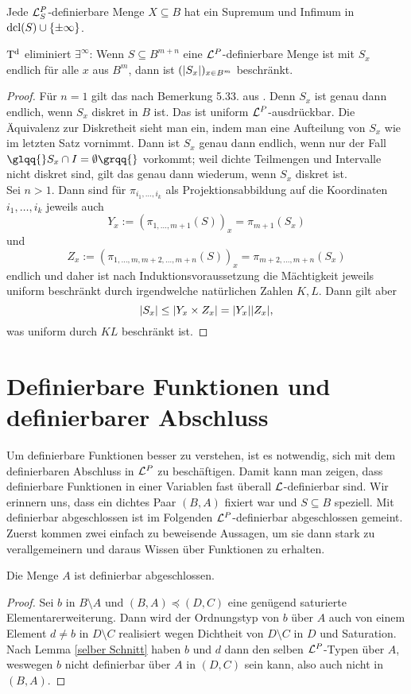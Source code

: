 \begin{corollary}
	Jede $\mathcal{L}^P_S$-definierbare Menge $X\subseteq B$ hat ein Supremum und Infimum in $\operatorname{dcl}(S)\cup\{\pm\infty\}$.
\end{corollary}

\begin{lemma}
	$\operatorname{T^d}$ eliminiert $\exists^\infty$: Wenn $S\subseteq B^{m+n}$ eine $\mathcal{L}^P$-definierbare Menge ist mit $S_x$ endlich für alle $x$ aus $B^m$, dann ist $({\left| S_x \right|})_{x\in B^m}$ beschränkt.
\end{lemma}
\begin{proof}
	Für $n=1$ gilt das nach Bemerkung 5.33. aus \cite{Lukas}. Denn $S_x$ ist genau dann endlich, wenn $S_x$ diskret in $B$ ist. Das ist uniform $\mathcal{L}^P$-ausdrückbar. Die Äquivalenz zur Diskretheit sieht man ein, indem man eine Aufteilung von $S_x$ wie im letzten Satz vornimmt. Dann ist $S_x$ genau dann endlich, wenn nur der Fall $\glqq{}S_x\cap I=\emptyset\grqq{}$ vorkommt; weil dichte Teilmengen und Intervalle nicht diskret sind, gilt das genau dann wiederum, wenn $S_x$ diskret ist.\\
	Sei $n>1$. Dann sind für $\pi_{i_1,\dots,i_k}$ als Projektionsabbildung auf die Koordinaten $i_1,\dots,i_k$ jeweils auch $$Y_x:=(\pi_{1,\dots,m+1}(S))_x=\pi_{m+1}(S_x)$$ und $$Z_x:=(\pi_{1,\dots,m,m+2,\dots,m+n}(S))_x=\pi_{m+2,\dots,m+n}(S_x)$$ endlich und daher ist nach Induktionsvoraussetzung die Mächtigkeit jeweils uniform beschränkt durch irgendwelche natürlichen Zahlen $K,L$. Dann gilt aber $${\left| S_x \right|}\leq {\left| Y_x\times Z_x \right|}={\left| Y_x \right|}{\left| Z_x \right|},$$ was uniform durch $KL$ beschränkt ist.
\end{proof}
\newpage
\section{Definierbare Funktionen und definierbarer Abschluss}
Um definierbare Funktionen besser zu verstehen, ist es notwendig, sich mit dem definierbaren Abschluss in $\mathcal{L}^P$ zu beschäftigen. Damit kann man zeigen, dass definierbare Funktionen in einer Variablen \glqq{}fast überall\grqq{} $\mathcal{L}$-definierbar sind. Wir erinnern uns, dass ein dichtes Paar $(B,A)$ fixiert war und $S\subseteq B$ speziell. Mit \glqq{}definierbar abgeschlossen\grqq{} ist im Folgenden \glqq{}$\mathcal{L}^P$-definierbar abgeschlossen\grqq{} gemeint. Zuerst kommen zwei einfach zu beweisende Aussagen, um sie dann stark zu verallgemeinern und daraus Wissen über Funktionen zu erhalten.

\begin{lemma}\label{A definierbar abgeschl}
	Die Menge $A$ ist definierbar abgeschlossen.
\end{lemma}
\begin{proof}
	Sei $b$ in $B\setminus A$ und $(B,A)\preceq(D,C)$ eine genügend saturierte Elementarerweiterung. Dann wird der Ordnungstyp von $b$ über $A$ auch von einem Element $d\neq b$ in $D\setminus C$ realisiert wegen Dichtheit von $D\setminus C$ in $D$ und Saturation.\\
	Nach Lemma \ref{selber Schnitt} haben $b$ und $d$ dann den selben $\mathcal{L}^P$-Typen über $A$, weswegen $b$ nicht definierbar über $A$ in $(D,C)$ sein kann, also auch nicht in $(B,A)$.
\end{proof}

